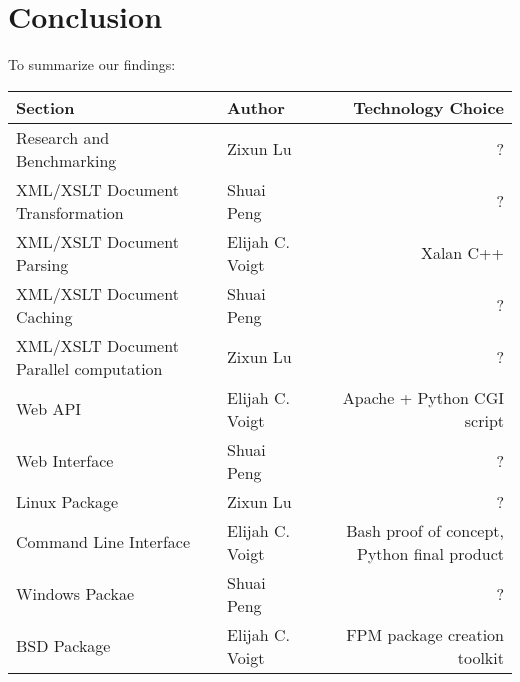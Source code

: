 \section{Conclusion}

To summarize our findings:

\begin{center}
    \begin{tabular}{ | l | m | r | }
    \hline
    Section & Author & Technology Choice\\ \hline
    Research and Benchmarking & Zixun Lu & ? \\ \hline
    XML/XSLT Document Transformation & Shuai Peng & ? \\ \hline
    XML/XSLT Document Parsing & Elijah C. Voigt & Xalan C++ \\ \hline
    XML/XSLT Document Caching & Shuai Peng & ? \\ \hline
    XML/XSLT Document Parallel computation & Zixun Lu & ? \\ \hline
    Web API & Elijah C. Voigt & Apache + Python CGI script \\ \hline
    Web Interface & Shuai Peng & ? \\ \hline
    Linux Package & Zixun Lu & ? \\ \hline
    Command Line Interface& Elijah C. Voigt & Bash proof of concept, Python final product \\ \hline
    Windows Packae & Shuai Peng & ? \\ \hline
    BSD Package & Elijah C. Voigt & FPM package creation toolkit \\ \hline
    \end{tabular}
\end{center}

\clearpage
